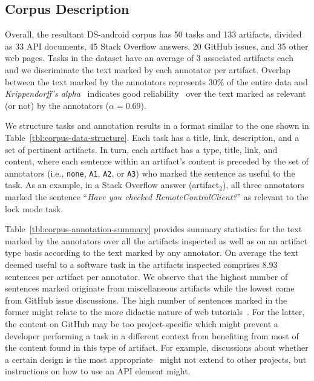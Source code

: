 




\subsection{Corpus Description}
\label{cp4:corpus-description}


Overall, the resultant \acs{DS-android} corpus has
50 tasks and 133 artifacts, divided as 33 API documents, 45 Stack Overflow answers, 20 GitHub issues, and 35 other web pages.
Tasks in the dataset have an average of 3 associated artifacts each
and we discriminate the text marked by each annotator per artifact.
Overlap between the text marked by the annotators represents 30\% of the entire data 
and \textit{Krippendorff's alpha}~\cite{krippendorff2018} indicates 
 good reliability~\cite{Nenkova2004} over the text marked as relevant (or not) by the annotators ($\alpha=0.69$).



We structure tasks and annotation results in a format similar to the one shown in 
Table~\ref{tbl:corpus-data-structure}. 
Each task has a  title, link, description, and a set of pertinent artifacts.
In turn, each artifact has a type, title, link, and content,
where each sentence within an artifact's content
is preceded by the set of 
annotators (i.e., \texttt{none}, \texttt{A1}, \texttt{A2}, or \texttt{A3}) who marked the sentence as useful to the task.
As an example, in a Stack Overflow answer (artifact$_2$), all three annotators 
marked the sentence ``\textit{Have you checked RemoteControlClient?}''
as relevant to the lock mode task.



\afterpage{
    
}





Table~\ref{tbl:corpus-annotation-summary} provides summary statistics for the text marked by 
the annotators over all the artifacts inspected as well as on an artifact type basis according to the text marked by any annotator.    
On average the text deemed useful to a software task in the artifacts inspected comprises 
8.93 sentences per artifact per annotator.
We observe that the highest number of sentences marked originate from miscellaneous artifacts
while the lowest come from GitHub issue discussions. 
The high number of sentences marked in the former might relate to the more didactic nature of web tutorials~\cite{arya2020, Jiang2017}.
For the latter, the content on GitHub may be too project-specific which might 
prevent a developer performing a task in a different context from benefiting from most of the content found in this type of artifact.
For example, discussions about whether a certain design is the most appropriate~\cite{Viviani2019} might not extend to other projects, but instructions on how to use an API element might.






